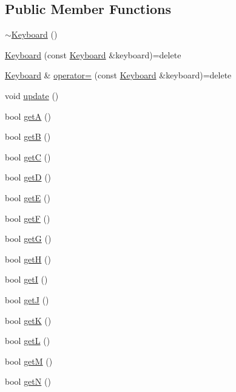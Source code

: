 \subsection*{Public Member Functions}
\begin{DoxyCompactItemize}
\item 
\hyperlink{class_keyboard_af6a99ec66c8c722a45b967bf79167038}{$\sim$\-Keyboard} ()
\item 
\hyperlink{class_keyboard_a6d15d5289af582f6f247ae333034db02}{Keyboard} (const \hyperlink{class_keyboard}{Keyboard} \&keyboard)=delete
\item 
\hyperlink{class_keyboard}{Keyboard} \& \hyperlink{class_keyboard_a92fe736c2e88e5ed828dd985c857da0a}{operator=} (const \hyperlink{class_keyboard}{Keyboard} \&keyboard)=delete
\item 
void \hyperlink{class_keyboard_a6410f07ddc53561a82d5328d8b330aab}{update} ()
\item 
bool \hyperlink{class_keyboard_acb69c710e18e3578fa5ed66e07e6b766}{get\-A} ()
\item 
bool \hyperlink{class_keyboard_abe467d1841c9c0b89c5856e9b3259980}{get\-B} ()
\item 
bool \hyperlink{class_keyboard_ae14994ae9d4a753c90511eee46f9b8eb}{get\-C} ()
\item 
bool \hyperlink{class_keyboard_ab9e7561799ddc1941283333dcd50c5e1}{get\-D} ()
\item 
bool \hyperlink{class_keyboard_ac1fbe5b7e31739174b7cd810521a2e9d}{get\-E} ()
\item 
bool \hyperlink{class_keyboard_a6fec87afe52371c8a264745a5c487d06}{get\-F} ()
\item 
bool \hyperlink{class_keyboard_a31aae98dfbc61407fa004ae2f7595452}{get\-G} ()
\item 
bool \hyperlink{class_keyboard_a0deba682104bf09a85d23ab4085d53f8}{get\-H} ()
\item 
bool \hyperlink{class_keyboard_a533b9c9ea72e078a6ed1081e0293a457}{get\-I} ()
\item 
bool \hyperlink{class_keyboard_a47d68d720a385e1b58d28ecffbf97964}{get\-J} ()
\item 
bool \hyperlink{class_keyboard_ac512b5cbd9f8c229a6a4c81c0ca12f91}{get\-K} ()
\item 
bool \hyperlink{class_keyboard_a0bb30d06c8ed37ae9e0e55135f2b7170}{get\-L} ()
\item 
bool \hyperlink{class_keyboard_a06888fa46c0dc92103a4d7416bfb474e}{get\-M} ()
\item 
bool \hyperlink{class_keyboard_a0b5d31dc62328f59af7ff137de090818}{get\-N} ()

\end{DoxyCompactItemize}
